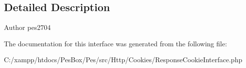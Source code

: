 \subsection{Detailed Description}
\begin{DoxyAuthor}{Author}
pes2704 
\end{DoxyAuthor}


The documentation for this interface was generated from the following file\+:\begin{DoxyCompactItemize}
\item 
C\+:/xampp/htdocs/\+Pes\+Box/\+Pes/src/\+Http/\+Cookies/Response\+Cookie\+Interface.\+php\end{DoxyCompactItemize}
